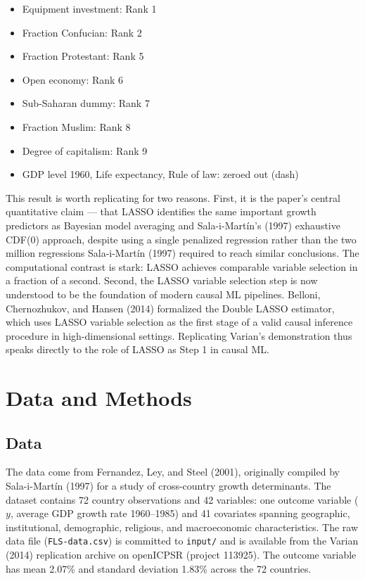 \documentclass[12pt]{article}
\begin{document}
\begin{itemize}
    \item Equipment investment: Rank 1
    \item Fraction Confucian: Rank 2
    \item Fraction Protestant: Rank 5
    \item Open economy: Rank 6
    \item Sub-Saharan dummy: Rank 7
    \item Fraction Muslim: Rank 8
    \item Degree of capitalism: Rank 9
    \item GDP level 1960, Life expectancy, Rule of law: zeroed out (dash)
\end{itemize}

This result is worth replicating for two reasons. First, it is the paper's
central quantitative claim --- that LASSO identifies the same important growth
predictors as Bayesian model averaging and Sala-i-Mart\'{i}n's (1997)
exhaustive CDF(0) approach, despite using a single penalized regression rather
than the two million regressions Sala-i-Mart\'{i}n (1997) required to reach
similar conclusions. The computational contrast is stark: LASSO achieves
comparable variable selection in a fraction of a second. Second, the LASSO
variable selection step is now understood to be the foundation of modern causal
ML pipelines. Belloni, Chernozhukov, and Hansen (2014) formalized the Double
LASSO estimator, which uses LASSO variable selection as the first stage of a
valid causal inference procedure in high-dimensional settings. Replicating
Varian's demonstration thus speaks directly to the role of LASSO as Step 1 in
causal ML.

\section{Data and Methods}

\subsection*{Data}

The data come from Fernandez, Ley, and Steel (2001), originally compiled by
Sala-i-Mart\'{i}n (1997) for a study of cross-country growth determinants.
The dataset contains 72 country observations and 42 variables: one outcome
variable ($y$, average GDP growth rate 1960--1985) and 41 covariates spanning
geographic, institutional, demographic, religious, and macroeconomic
characteristics. The raw data file (\texttt{FLS-data.csv}) is committed to
\texttt{input/} and is available from the Varian (2014) replication archive on
openICPSR (project 113925). The outcome variable has mean 2.07\% and standard
deviation 1.83\% across the 72 countries.
\end{document}
